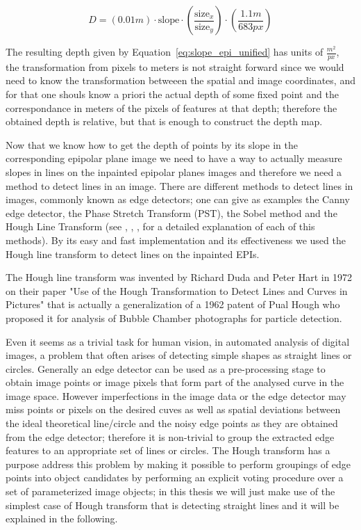 \begin{equation}
\label{eq:slope_epi_unified}
D = (0.01m)\cdot \textrm{slope}\cdot\left(\frac{\textrm{size}_x}{\textrm{size}_y}\right)\cdot\left(\frac{1.1m}{683px}\right)
\end{equation}

\bigskip

The resulting depth given by Equation~\ref{eq:slope_epi_unified} has units of $\frac{m^2}{px}$, the transformation from pixels to meters is not straight forward since we would need to know the transformation betweeen the spatial and image coordinates, and for that one shouls know a priori the actual depth of some fixed point and the correspondance in meters of the pixels of features at that depth; therefore the obtained depth is relative, but that is enough to construct the depth map.

\bigskip

Now that we know how to get the depth of points by its slope in the corresponding epipolar plane image we need to have a way to actually measure slopes in lines on the inpainted epipolar planes images and therefore we need a method to detect lines in an image. There are different methods to detect lines in images, commonly known as edge detectors; one can give as examples the Canny edge detector, the Phase Stretch Transform (PST), the Sobel method and the Hough Line Transform (see \cite{LearnOpenCV}, \cite{MultipleView}, \cite{hough-duda}, \cite{hough-invented} for a detailed explanation of each of this methods). By its easy and fast implementation and its effectiveness we used the Hough line transform to detect lines on the inpainted EPIs. 

\bigskip

The Hough line transform was invented by Richard Duda and Peter Hart in 1972 on their paper "Use of the Hough Transformation to Detect Lines and Curves in Pictures"\cite{hough-duda} that is actually a generalization of a 1962 patent of Pual Hough\cite{hough-original} who proposed it for analysis of Bubble Chamber photographs for particle detection.

\bigskip

Even it seems as a trivial task for human vision, in automated analysis of digital images, a problem that often arises of detecting simple shapes as straight lines or circles. Generally an edge detector can be used as a pre-processing stage to obtain image points or image pixels that form part of the analysed curve in the image space. However imperfections in the image data or the edge detector may miss points or pixels on the desired cuves as well as spatial deviations between the ideal theoretical line/circle and the noisy edge points as they are obtained from the edge detector; therefore it is non-trivial to group the extracted edge features to an appropriate set of lines or circles. The Hough transform has a purpose address this problem by making it possible to perform groupings of edge points into object candidates by performing an explicit voting procedure over a set of parameterized image objects; in this thesis we will just make use of the simplest case of Hough transform that is detecting straight lines and it will be explained in the following.

